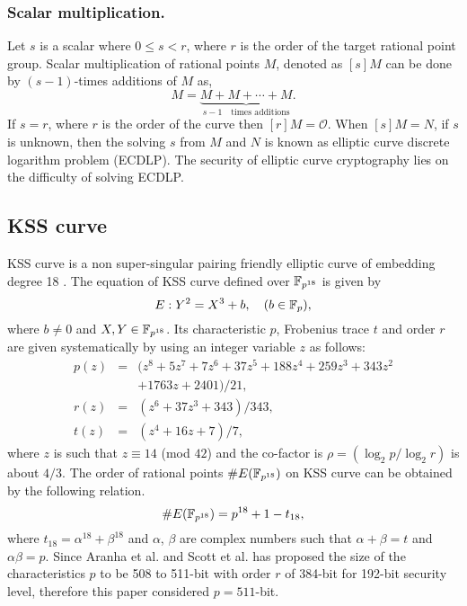 \subsubsection{Scalar multiplication.}
Let $s$ is a scalar where $0 \leq s < r$, where $r$ is the order of the target rational point group. Scalar multiplication of rational points $M$, denoted as $[s]M$ can be done by $(s-1)$-times additions of $M$ as,
\begin{equation}
[s]M = \underbrace{M+M+ \cdots +M}_{s-1 \quad \mbox{times additions}}.
\end{equation}
If $s = r$, where $r$ is the order of the curve then $[r]M = \mathcal{O}$. When $[s]M = N$, if $s$ is unknown, then the solving $s$ from $M$ and $N$ is known as elliptic curve discrete logarithm problem (ECDLP). The security of elliptic curve cryptography lies on the difficulty of solving ECDLP.


\subsection{KSS curve}
KSS curve is a non super-singular pairing friendly elliptic curve of embedding degree 18 \cite{kss}. The equation of KSS curve defined over $\mathbb{F}_{p^{18}}$ is given by 
\begin{equation}\label{eq:KSS_curve}
E:Y^2=X^3+b, \quad \mbox{($b \in {\mathbb{F}}_{p}$)},
\end{equation}
where $b \neq 0$ and $X,Y \in \mathbb{F}_{p^{18}}$. Its characteristic $p$, Frobenius trace $t$ and order $r$ are given systematically by using an integer variable $z$ as follows:
\begin{subequations}
\begin{eqnarray}
p(z) &= & (z^8 +5z^7 +7z^6 +37z^5 +188z^4 +259z^3 +343z^2  \nonumber \\ 								
& & +1763z+2401)/21,\\\label{eq:kss_char}
r(z) &= &(z^6 + 37z^3 + 343)/343,\label{eq:kss_degree}  \\
t(z) &=& (z^4 + 16z + 7)/7, \label{eq:kss_trace} 
\end{eqnarray}
\end{subequations} 
where $z$ is such that $z \equiv 14$ (mod $42$) and the co-factor is $\rho = (\log_2 p/\log_2 r)$ is about $4/3$.
The order of rational points $\#E(\mathbb{F}_{p^{18}})$ on KSS curve can be obtained by the following relation.
\begin{equation}\label{eq:order_relation}
\#E(\mathbb{F}_{p^{18}}) = p^{18}+1-t_{18},
\end{equation}
where $t_{18} = \alpha^{18}+\beta^{18}$ and $\alpha$, $\beta$ are complex numbers such that $\alpha+\beta = t$ and $\alpha\beta=p$.
Since Aranha et al. \cite{aranha} and Scott et al. \cite{kss_param} has proposed the size of the characteristics $p$ to be 508 to 511-bit with order $r$ of 384-bit  for 192-bit security level, therefore this paper considered $p=511$-bit.

